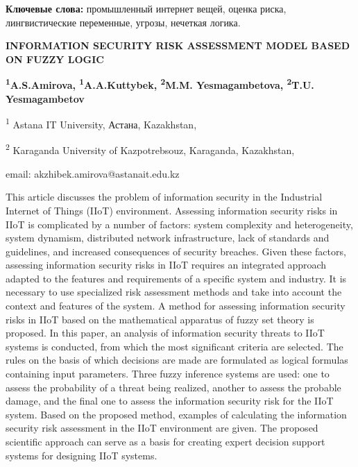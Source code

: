 {\bfseries Ключевые слова:} промышленный интернет вещей, оценка риска,
лингвистические переменные, угрозы, нечеткая логика.

\begin{articleheader}
{\bfseries INFORMATION SECURITY RISK ASSESSMENT MODEL BASED ON FUZZY LOGIC}

{\bfseries
\textsuperscript{1}A.S.Amirova\textsuperscript{\envelope },
\textsuperscript{1}A.A.Kuttybek,
\textsuperscript{2}M.M. Yesmagambetova,
\textsuperscript{2}T.U. Yesmagambetov}
\end{articleheader}

\begin{affiliation}
\textsuperscript{1} Astana IT University, Астана, Kazakhstan,

\textsuperscript{2} Karaganda University of Kazpotrebsouz, Karaganda, Kazakhstan,

email: akzhibek.amirova@astanait.edu.kz
\end{affiliation}

This article discusses the problem of information security in the
Industrial Internet of Things (IIoT) environment. Assessing information
security risks in IIoT is complicated by a number of factors: system
complexity and heterogeneity, system dynamism, distributed network
infrastructure, lack of standards and guidelines, and increased
consequences of security breaches. Given these factors, assessing
information security risks in IIoT requires an integrated approach
adapted to the features and requirements of a specific system and
industry. It is necessary to use specialized risk assessment methods and
take into account the context and features of the system. A method for
assessing information security risks in IIoT based on the mathematical
apparatus of fuzzy set theory is proposed. In this paper, an analysis of
information security threats to IIoT systems is conducted, from which
the most significant criteria are selected. The rules on the basis of
which decisions are made are formulated as logical formulas containing
input parameters. Three fuzzy inference systems are used: one to assess
the probability of a threat being realized, another to assess the
probable damage, and the final one to assess the information security
risk for the IIoT system. Based on the proposed method, examples of
calculating the information security risk assessment in the IIoT
environment are given. The proposed scientific approach can serve as a
basis for creating expert decision support systems for designing IIoT
systems.


